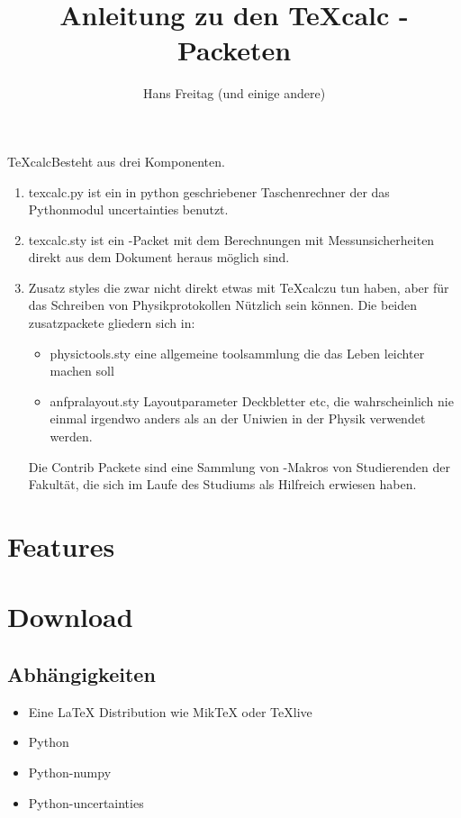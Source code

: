 \documentclass[a4paper]{article}
\newcommand{\texcalc}{{\TeX}calc}
\begin{document}
\title{Anleitung zu den {\TeX}calc \LaTeXe-Packeten}
\author{Hans Freitag (und einige andere)}
\maketitle 

\texcalc Besteht aus drei Komponenten. 

\begin{enumerate}
\item texcalc.py ist ein in python geschriebener Taschenrechner der das Pythonmodul 
		uncertainties benutzt.
\item texcalc.sty ist ein \LaTeXe-Packet mit dem Berechnungen mit Messunsicherheiten 
		direkt aus dem \LaTeXe Dokument heraus möglich sind. 
\item Zusatz styles die zwar nicht direkt etwas mit \texcalc zu tun haben, aber für 
		das Schreiben von Physikprotokollen Nützlich sein können. Die beiden zusatzpackete 
		gliedern sich in:
	\begin{itemize}
	\item physictools.sty eine allgemeine toolsammlung die das Leben leichter machen soll
	\item anfpralayout.sty Layoutparameter Deckbletter etc, die wahrscheinlich nie einmal 
		irgendwo anders als an der Uniwien in der Physik verwendet werden. 
	\end{itemize}
	Die Contrib Packete sind eine Sammlung von \LaTeXe-Makros von Studierenden der Fakultät, 
	die sich im Laufe des Studiums als Hilfreich erwiesen haben. 
\end{enumerate}


\tableofcontents

\section{Features}


\section{Download}

\subsection{Abhängigkeiten}

\begin{itemize}
\item Eine LaTeX Distribution wie MikTeX oder TeXlive
\item Python 
\item Python-numpy
\item Python-uncertainties
\end{itemize}
\end{document}
